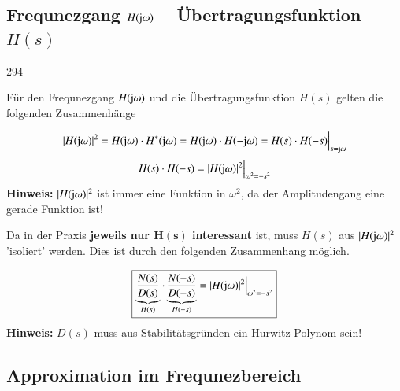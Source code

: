 

\subsection[Frequnezgang H(jimg omega) -- Übertragungsfunktion H(s)]{Frequnezgang $H(\mathrm{j} \omega)$ -- Übertragungsfunktion $H(s)$}{294}

Für den Frequnezgang $H(\mathrm{j} \omega)$ und die Übertragungsfunktion $H(s)$ gelten die folgenden Zusammenhänge

$$ | H(\mathrm{j} \omega) |^2 = H(\mathrm{j} \omega) \cdot H^*(\mathrm{j} \omega) = H(\mathrm{j} \omega) \cdot H(- \mathrm{j} \omega) = H(s) \cdot H(-s) \Big|_{s = \mathrm{j} \omega} $$
$$ H(s) \cdot H(-s) = | H(\mathrm{j} \omega) |^2 \Big|_{\omega^2 = -s^2} $$
\textbf{Hinweis:} $| H(\mathrm{j} \omega) |^2$ ist immer eine Funktion in $\omega^2$, da der Amplitudengang eine gerade Funktion ist!

\vspace{0.2cm}

Da in der Praxis \textbf{jeweils nur $\bm{H(s)}$ interessant} ist, muss $H(s)$ aus $| H(\mathrm{j} \omega) |^2$ 'isoliert' werden. 
Dies ist durch den folgenden Zusammenhang möglich.

$$ \boxed{ \underbrace{ \frac{N(s)}{D(s)} }_{H(s)} \cdot  \underbrace{ \frac{N(-s)}{D(-s)} }_{H(-s)} = | H(\mathrm{j} \omega) |^2 \Big|_{\omega^2 = -s^2} } $$
\textbf{Hinweis:} $D(s)$ muss aus Stabilitätsgründen ein Hurwitz-Polynom sein!


\subsection{Approximation im Frequnezbereich}

